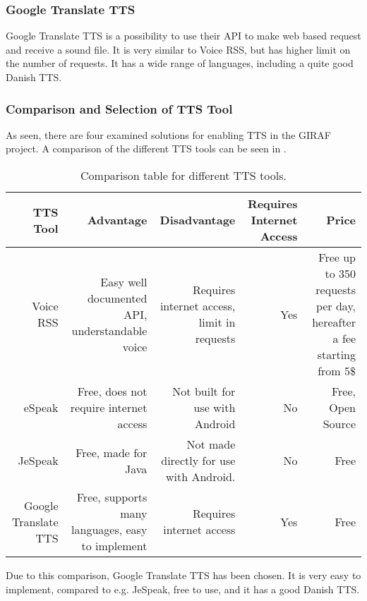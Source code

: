 \subsubsection{Google Translate TTS}
Google Translate TTS is a possibility to use their API to make web based request and receive a sound file. It is very similar to Voice RSS, but has higher limit on the number of requests. It has a wide range of languages, including a quite good Danish TTS. 

\subsubsection{Comparison and Selection of TTS Tool}
As seen, there are four examined solutions for enabling TTS in the GIRAF project. A comparison of the different TTS tools can be seen in .

\begin{table}[H]
    \begin{tabularx}{\textwidth}{|R|R|R|R|R|}
    \hline
    \textbf{TTS Tool}             &\textbf{Advantage}                                   &\textbf{Disadvantage}                               & \textbf{Requires Internet Access} &\textbf{Price}                                                      \\ \hline
    Voice RSS            & Easy well documented API, understandable voice    & Requires internet access, limit in requests & Yes                     & Free up to 350 requests per day, hereafter a fee starting from 5\$ \\ \hline
    eSpeak               & Free, does not require internet access            & Not built for use with Android             & No                      & Free, Open Source                                          \\ \hline
    JeSpeak              & Free, made for Java                             & Not made directly for use with Android.    & No                      & Free                                                       \\ \hline
    Google Translate TTS & Free, supports many languages, easy to implement & Requires internet access                    & Yes                     & Free                                                       \\ \hline
    \end{tabularx}
    \caption{Comparison table for different TTS tools.}
    \label{tab:ttscomp}
\end{table}

Due to this comparison, Google Translate TTS has been chosen. It is very easy to implement, compared to e.g. JeSpeak, free to use, and it has a good Danish TTS.